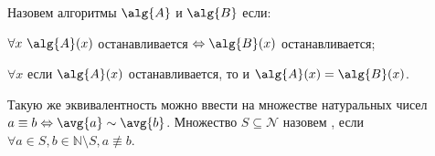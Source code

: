 





\setcounter{curtask}{9}


\begin{definition*}
    Назовем алгоритмы $\alg{A}$ и $\alg{B}$  если:
    \begin{itemtask}
        \item $\forall x\  \alg{A}(x)$ останавливается $\Leftrightarrow \alg{B}(x)$ останавливается;
        \item $\forall x$ если $\alg{A}(x)$ останавливается, то и $\alg{A}(x) = \alg{B}(x)$.
    \end{itemtask}

    Такую же эквивалентность можно ввести на множестве натуральных чисел $a \equiv b \Leftrightarrow
    \avg{a} \sim \avg{b}$. Множество $S \subseteq \mathcal{N}$ назовем , если
    $\forall a \in S, b \in \mathbb{N} \setminus S, a \not\equiv b$.    
\end{definition*}



\breakline







